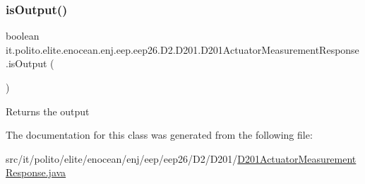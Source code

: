 \subsubsection{\texorpdfstring{is\+Output()}{isOutput()}}
{\footnotesize\ttfamily boolean it.\+polito.\+elite.\+enocean.\+enj.\+eep.\+eep26.\+D2.\+D201.\+D201\+Actuator\+Measurement\+Response.\+is\+Output (\begin{DoxyParamCaption}{ }\end{DoxyParamCaption})}

\begin{DoxyReturn}{Returns}
the output 
\end{DoxyReturn}


The documentation for this class was generated from the following file\+:\begin{DoxyCompactItemize}
\item 
src/it/polito/elite/enocean/enj/eep/eep26/\+D2/\+D201/\hyperlink{_d201_actuator_measurement_response_8java}{D201\+Actuator\+Measurement\+Response.\+java}\end{DoxyCompactItemize}
